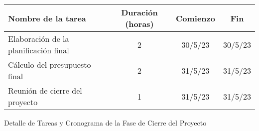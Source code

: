 \begin{planificacion}
	\centering
	\begin{tabular}{ | m{9cm} | c | c | c | }
		\hline
		\textbf{Nombre de la tarea}           & \textbf{Duración (horas)} & \textbf{Comienzo} & \textbf{Fin} \\\hline
		Elaboración de la planificación final & 2                         & 30/5/23           & 30/5/23      \\\hline
		Cálculo del presupuesto final         & 2                         & 31/5/23           & 31/5/23      \\\hline
		Reunión de cierre del proyecto        & 1                         & 31/5/23           & 31/5/23      \\\hline
	\end{tabular}
	\caption{Detalle de Tareas y Cronograma de la Fase de Cierre del Proyecto}
\end{planificacion}
